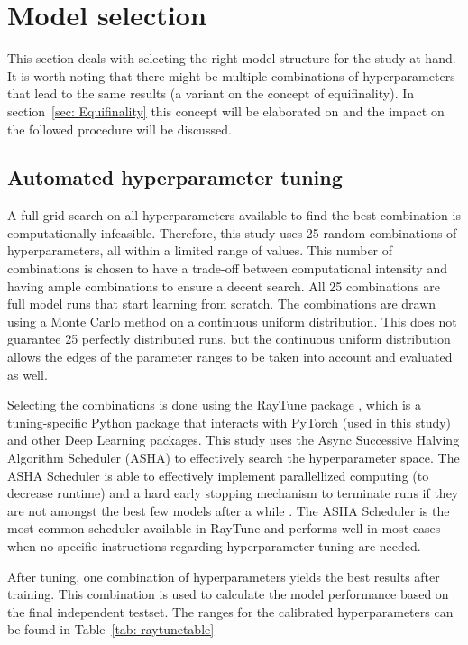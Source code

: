 \documentclass[twocolumn, 10pt, a4paper]{memoir}
\begin{document}
	
	
	\section{Model selection} \label{sec: modelselection}
	This section deals with selecting the right model structure for the study at hand. It is worth noting that there might be multiple combinations of hyperparameters that lead to the same results (a variant on the concept of equifinality). In section~\ref{sec: Equifinality} this concept will be elaborated on and the impact on the followed procedure will be discussed.
	
	\subsection{Automated hyperparameter tuning} \label{sec: RayTune}
	A full grid search on all hyperparameters available to find the best combination is computationally infeasible. Therefore, this study uses 25 random combinations of hyperparameters, all within a limited range of values. This number of combinations is chosen to have a trade-off between computational intensity and having ample combinations to ensure a decent search. All 25 combinations are full model runs that start learning from scratch. The combinations are drawn using a Monte Carlo method on a continuous uniform distribution. This does not guarantee 25 perfectly distributed runs, but the continuous uniform distribution allows the edges of the parameter ranges to be taken into account and evaluated as well. 
	
	Selecting the combinations is done using the RayTune package \cite{Liaw2018}, which is a tuning-specific Python package that interacts with PyTorch (used in this study) and other Deep Learning packages. This study uses the Async Successive Halving Algorithm Scheduler (ASHA) to effectively search the hyperparameter space. The ASHA Scheduler is able to effectively implement parallellized computing (to decrease runtime) and a hard early stopping mechanism to terminate runs if they are not amongst the best few models after a while \cite{Li2018}. The ASHA Scheduler is the most common scheduler available in RayTune and performs well in most cases when no specific instructions regarding hyperparameter tuning are needed. 
	 
	After tuning, one combination of hyperparameters yields the best results after training. This combination is used to calculate the model performance based on the final independent testset. The ranges for the calibrated hyperparameters can be found in Table~\ref{tab: raytunetable}
	
\end{document}
